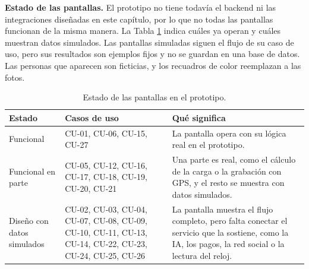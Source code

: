 \newcommand{\uipar}[6]{%
\begin{minipage}[t]{7.75cm}\raggedright\textbf{#1}\par\vspace{0.1cm}\uitexto{#2}\vspace{0.2cm}\uifoto{#3}\hspace{0.3cm}\uifoto{#4}
\captionof{figure}{Interfaces -- #5.}\label{#6}\end{minipage}}
\newcommand{\uiweblado}[6]{%
\noindent\begin{minipage}{\linewidth}
\textbf{#1}\par\vspace{0.1cm}
\uitexto{#2}\vspace{0.2cm}
\centering\uiweb{#3}\hfill\uiweb{#4}
\captionof{figure}{Interfaces -- #5.}\label{#6}
\end{minipage}\par\vspace{0.3cm}}

\textbf{Estado de las pantallas.} El prototipo no tiene todavía el backend ni las integraciones diseñadas en este capítulo, por lo que no todas las pantallas funcionan de la misma manera. La Tabla \ref{tab:estado_interfaces} indica cuáles ya operan y cuáles muestran datos simulados. Las pantallas simuladas siguen el flujo de su caso de uso, pero sus resultados son ejemplos fijos y no se guardan en una base de datos. Las personas que aparecen son ficticias, y los recuadros de color reemplazan a las fotos.

\begin{table}[h!]
    \centering
    \renewcommand{\arraystretch}{1.2}
    \small
    \begin{tabular}{|>{\raggedright\arraybackslash}p{3.1cm}|>{\raggedright\arraybackslash}p{4.4cm}|>{\raggedright\arraybackslash}p{7.4cm}|}
        \hline
        \rowcolor[HTML]{EFEFEF}
        \textbf{Estado} & \textbf{Casos de uso} & \textbf{Qué significa} \\ \hline
        Funcional & CU-01, CU-06, CU-15, CU-27 & La pantalla opera con su lógica real en el prototipo. \\ \hline
        Funcional en parte & CU-05, CU-12, CU-16, CU-17, CU-18, CU-19, CU-20, CU-21 & Una parte es real, como el cálculo de la carga o la grabación con GPS, y el resto se muestra con datos simulados. \\ \hline
        Diseño con datos simulados & CU-02, CU-03, CU-04, CU-07, CU-08, CU-09, CU-10, CU-11, CU-13, CU-14, CU-22, CU-23, CU-24, CU-25, CU-26 & La pantalla muestra el flujo completo, pero falta conectar el servicio que la sostiene, como la IA, los pagos, la red social o la lectura del reloj. \\ \hline
    \end{tabular}
    \caption{Estado de las pantallas en el prototipo.}
    \label{tab:estado_interfaces}
\end{table}

